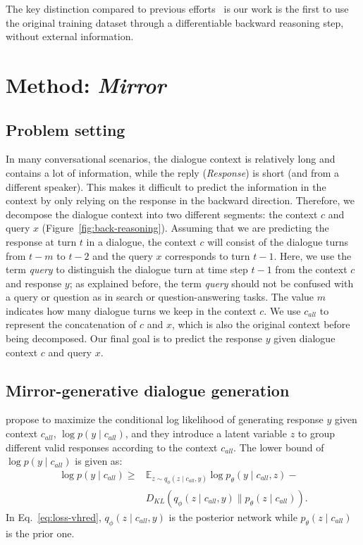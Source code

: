 \documentclass[sigconf]{acmart}
\begin{document}
The key distinction compared to previous efforts~\citep{li2015diversity,baheti2018generating} is our work is the first to use the original training dataset through a differentiable backward reasoning step, without external information. 



\section{Method: \emph{Mirror}}
\label{sec:method}
\subsection{Problem setting}
In many conversational scenarios, the dialogue context is relatively long and contains a lot of information, while the reply (\emph{Response}) is short (and from a different speaker). This makes it difficult to predict the information in the context by only relying on the response in the backward direction. 
Therefore, we decompose the dialogue context into two different segments: the context $c$ and query $x$ (Figure~\ref{fig:back-reasoning}). 
Assuming that we are predicting the response at turn $t$ in a dialogue, the context $c$ will consist of the dialogue turns from $t-m$ to $t-2$ and the query $x$ corresponds to turn $t-1$. 
Here, we use the term \emph{query} to distinguish the dialogue turn at time step $t-1$ from the context $c$ and response $y$; as explained before, the term \emph{query} should not be confused with a query or question as in search or question-answering tasks. 
The value $m$ indicates how many dialogue turns we keep in the context $c$. 
We use $c_{all}$ to represent the concatenation of $c$ and $x$, which is also the original context before being decomposed. 
Our final goal is to predict the response $y$ given dialogue context $c$ and query $x$. 

\subsection{Mirror-generative dialogue generation}
\label{section:mirror-method}
\citet{shen2017conditional} propose to maximize the conditional log likelihood of generating response $y$ given context $c_{all}$, $\log p(y \mid c_{all})$,  and they introduce a latent variable $z$ to group different valid responses according to the context $c_{all}$. 
The lower bound of $\log p(y \mid c_{all})$ is given as:
%
\begin{equation}
\begin{split}
\log p(y \mid c_{all}) \geq{} &  \mathbb{E}_{z \sim q_\phi(z \mid c_{all}, y)} \log p_\theta (y \mid c_{all}, z)  - {}\\
& D_\mathit{KL}(q_\phi(z \mid c_{all}, y) \| p_\theta(z \mid c_{all})).
\end{split}
\label{eq:loss-vhred}
\end{equation}
In Eq.~\ref{eq:loss-vhred}, $q_\phi(z \mid c_{all}, y)$ is the posterior network while $p_\theta(z \mid c_{all})$ is the prior one.
\end{document}
